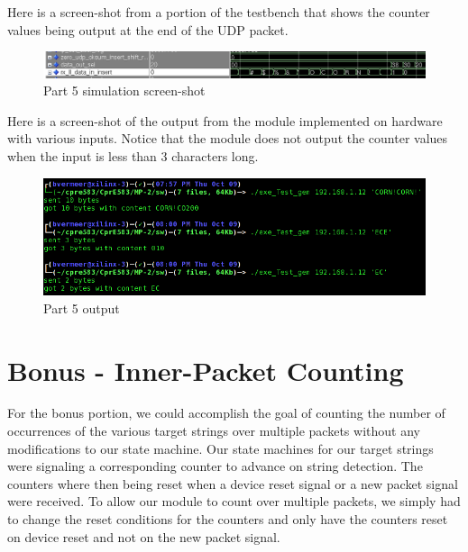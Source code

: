 \documentclass{article}
\begin{document}
Here is a screen-shot from a portion of the testbench that shows the counter values being output at the end of the UDP packet.

	\begin{figure}[H]
		\begin{center}
			\includegraphics[scale=0.45]{../part5_files/Part5_waveform_screenshot.png}
			\caption{Part 5 simulation screen-shot}
		\end{center}
	\end{figure}
	
Here is a screen-shot of the output from the module implemented on hardware with various inputs. Notice that the module does not output the counter values when the input is less than 3 characters long.

	\begin{figure}[H]
		\begin{center}
			\includegraphics[scale=0.45]{../part5_files/Part5_output_screenshot.png}
			\caption{Part 5 output}
		\end{center}
	\end{figure}


\section{Bonus - Inner-Packet Counting}
For the bonus portion, we could accomplish the goal of counting the number of occurrences of the various target strings over multiple packets without any modifications to our state machine. Our state machines for our target strings were signaling a corresponding counter to advance on string detection. The counters where then being reset when a device reset signal or a new packet signal were received. To allow our module to count over multiple packets, we simply had to change the reset conditions for the counters and only have the counters reset on device reset and not on the new packet signal. \\
\end{document}
